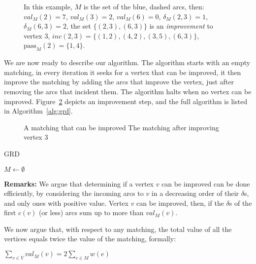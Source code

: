 \begin{figure}
\centering

\caption[]{
\label{fig:defs}
In this example, $M$ is the set of the blue, dashed arcs, then:
$val_M(2) = 7$,
$val_M(3) = 2$,
$val_M(6) = 0$,
$\delta_M(2, 3) = 1$,
$\delta_M(6, 3) = 2$,
the set $\{(2,3), (6,3)\}$ is an \emph{improvement} to vertex 3,
$inc(2,3) = \{(1,2),(4,2),(3,5),(6,3)\}$,
$\text{pass}_M(2) = \{1, 4\}$.
}
\end{figure}

We are now ready to describe our algorithm.
The algorithm starts with an empty matching,
in every iteration it seeks for a vertex that can be improved,
it then improve the matching by adding
the arcs that improve the vertex, 
just after removing the arcs that incident them.
The algorithm halts when no vertex can be improved.
Figure~\ref{fig:improvement} depicts an improvement step,
and the full algorithm is listed in Algorithm~\ref{alg:grd}. 

\begin{figure}
\centering

\caption[]{
\label{fig:improvement}
A matching that can be improved
The matching after improving vertex 3
}
\end{figure}

\begin{algorithm}
\caption{
\label{alg:grd}
GRD
}
$M \leftarrow \emptyset$									\\
\end{algorithm}

\textbf{Remarks:}
We argue that determining if a vertex $v$ can be improved can be done efficiently,
by considering the incoming arcs to $v$ in a decreasing order of their $\delta$s,
and only ones with positive value.
Vertex $v$ can be improved, then, if the $\delta$s of the first $c(v)$ (or less) arcs
sum up to more than $val_M(v)$.


We now argue that, with respect to any matching, 
the total value of all the vertices equals twice the value of the matching, 
formally: 
\begin{lemma}
\label{lm:val-twice}
$\sum_{v \in V} val_M(v) = 2 \sum_{e \in M} w(e)$
\end{lemma}

